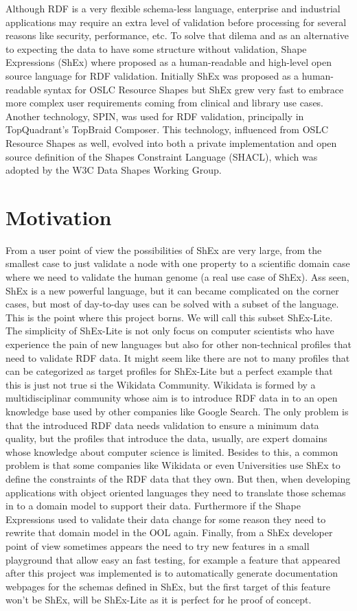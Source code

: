Although RDF is a very flexible schema-less language, enterprise and industrial applications may require an extra level of validation before processing for several reasons like security, performance, etc.
To solve that dilema and as an alternative to expecting the data to have some structure without validation, Shape Expressions (ShEx) where proposed as a human-readable and high-level open source language for RDF validation. Initially ShEx was proposed as a human-readable syntax for OSLC Resource Shapes  but ShEx grew very fast to embrace more complex user requirements coming from clinical and library use cases.
Another technology, SPIN, was used for RDF validation, principally in TopQuadrant’s TopBraid Composer. This technology, influenced from OSLC Resource Shapes as well, evolved into both a private implementation and open source definition of the Shapes Constraint Language (SHACL), which was adopted by the W3C Data Shapes Working Group.

\section{Motivation}

From a user point of view the possibilities of ShEx are very large, from the smallest case to just validate a node with one property to a scientific domain case where we need to validate the human genome (a real use case of ShEx). Ass seen, ShEx is a new powerful language, but it can became complicated on the corner cases, but most of day-to-day uses can be solved with a subset of the language. This is the point where this project borns. We will call this subset ShEx-Lite. The simplicity of ShEx-Lite is not only focus on computer scientists who have experience the pain of new languages but also for other non-technical profiles that need to validate RDF data.
It might seem like there are not to many profiles that can be categorized as target profiles for ShEx-Lite but a perfect example that this is just not true si the Wikidata Community. Wikidata is formed by a multidisciplinar community whose aim is to introduce RDF data in to an open knowledge base used by other companies like Google Search. The only problem is that the introduced RDF data needs validation to ensure a minimum data quality, but the profiles that introduce the data, usually, are expert domains whose knowledge about computer science is limited.
Besides to this, a common problem is that some companies like Wikidata or even Universities use ShEx to define the constraints of the RDF data that they own. But then, when developing applications with object oriented languages they need to translate those schemas in to a domain model to support their data. Furthermore if the Shape Expressions used to validate their data change for some reason they need to rewrite that domain model in the OOL again.
Finally, from a ShEx developer point of view sometimes appears the need to try new features in a small playground that allow easy an fast testing, for example a feature that appeared after this project was implemented is to automatically generate documentation webpages for the schemas defined in ShEx, but the first target of this feature won’t be ShEx, will be ShEx-Lite as it is perfect for he proof of concept.


